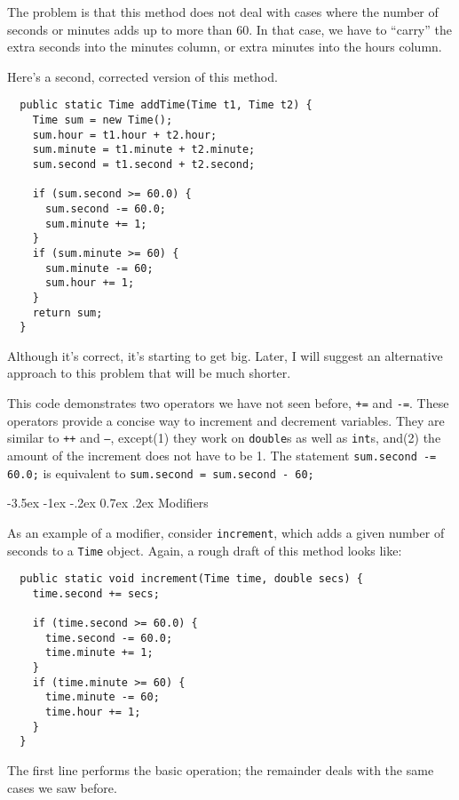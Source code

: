 \documentclass{book}
\makeatletter
\renewcommand{\section}{\@startsection 
    {section} {1} {0mm}%
    {-3.5ex \@plus -1ex \@minus -.2ex}%
    {0.7ex \@plus.2ex}%
    {\normalfont\Large\bfseries}}
\makeatother
\begin{document}
The problem is that this method does not deal with cases
where the number of seconds or minutes adds up to more than
60.  In that case, we have to ``carry'' the extra seconds
into the minutes column, or extra minutes into the hours
column.

Here's a second, corrected version of this method.

\begin{verbatim}
  public static Time addTime(Time t1, Time t2) {
    Time sum = new Time();
    sum.hour = t1.hour + t2.hour;
    sum.minute = t1.minute + t2.minute;
    sum.second = t1.second + t2.second;

    if (sum.second >= 60.0) {
      sum.second -= 60.0;
      sum.minute += 1;
    }
    if (sum.minute >= 60) {
      sum.minute -= 60;
      sum.hour += 1;
    }
    return sum;
  }
\end{verbatim}
%
Although it's correct, it's starting to get big.  Later,
I will suggest an alternative approach to this problem that
will be much shorter.


This code demonstrates two operators we have not seen before,
{\tt +=} and {\tt -=}.  These operators provide a concise
way to increment and decrement variables.  They are similar
to {\tt ++} and {\tt --}, except(1) they work on {\tt double}s
as well as {\tt int}s, and(2) the amount of the increment
does not have to be 1.  The statement {\tt sum.second -= 60.0;}
is equivalent to {\tt sum.second = sum.second - 60;}

\section{Modifiers}

As an example of a modifier, consider {\tt increment},
which adds a given number of seconds to a {\tt Time} object.
Again, a rough draft of this method looks like:

\begin{verbatim}
  public static void increment(Time time, double secs) {
    time.second += secs;

    if (time.second >= 60.0) {
      time.second -= 60.0;
      time.minute += 1;
    }
    if (time.minute >= 60) {
      time.minute -= 60;
      time.hour += 1;
    }
  }
\end{verbatim}
%
The first line performs the basic operation; the remainder
deals with the same cases we saw before.
\end{document}
